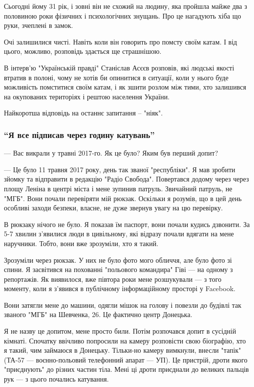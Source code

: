 Сьогодні йому 31 рік, і зовні він не схожий на людину, яка пройшла майже два з
половиною роки фізичних і психологічних знущань. Про це нагадують хіба що руки,
зчеплені в замок. 

Очі залишилися чисті. Навіть коли він говорить про помсту своїм катам. І від
цього, можливо, розповідь здається ще страшнішою.

В інтерв’ю "Українській правді" Станіслав Асєєв розповів, які людські якості
втратив в полоні, чому не хотів би опинитися в ситуації, коли у нього буде
можливість помститися своїм катам, і як зшити розлом між тими, хто залишився на
окупованих територіях і рештою населення України. 

Найкоротша відповідь на останнє запитання – "ніяк". 


\subsubsection{\enquote{Я все підписав через годину катувань}}

— Вас викрали у травні 2017-го. Як це було? Яким був перший допит? 

— Це було 11 травня 2017 року, день так званої "республіки". Я мав зробити
зйомку та відправити в редакцію "Радіо Свобода". Повертався додому через через
площу Леніна в центрі міста і мене зупинив патруль. Звичайний патруль, не
"МГБ". Вони почали перевіряти мій рюкзак. Оскільки я розумів, що в цей день
особливі заходи безпеки, власне, не дуже звернув увагу на цю перевірку.

В рюкзаку нічого не було. Я показав їм паспорт, вони почали кудись дзвонити. За
5-7 хвилин з’явилися люди в цивільному, які відразу почали вдягати на мене
наручники. Тобто, вони вже зрозуміли, хто я такий.

Зрозуміли через рюкзак. У них не було фото мого обличчя, але було фото зі
спини. Я засвітився на похованні "польового командира" Гіві — на одному з
репортажів. Як виявилося, вже півтора роки мене розшукували — з того моменту,
коли я з’явився в публічному інформаційному просторі у Facebook.

Вони затягли мене до машини, одягли мішок на голову і повезли до будівлі так
званого "МГБ" на Шевченка, 26. Це фактично центр Донецька.

Я не назву це допитом, мене просто били. Потім розпочався допит в сусідній
кімнаті. Спочатку ввічливо попросили на камеру розповісти свою біографію, хто я
такий, чим займаюся в Донецьку. Тільки-но камеру вимкнули, внесли "тапік"
(ТА-57 — воєнно-польовий телефонний апарат — УП). Це пристрій, дроти якого
"приєднують" до різних частин тіла. Мені ці дроти приєднали до великих пальців
рук — з цього почались катування.

